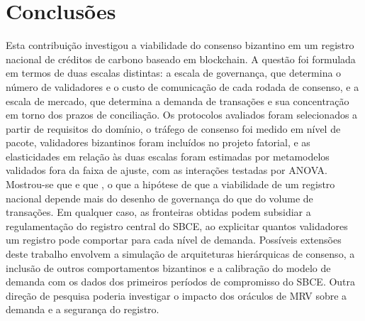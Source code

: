 \section{Conclusões}
\label{sec:conclusion}

Esta contribuição investigou a viabilidade do consenso bizantino em um registro nacional de créditos de carbono baseado em blockchain. A questão foi formulada em termos de duas escalas distintas: a escala de governança, que determina o número de validadores e o custo de comunicação de cada rodada de consenso, e a escala de mercado, que determina a demanda de transações e sua concentração em torno dos prazos de conciliação. Os protocolos avaliados foram selecionados a partir de requisitos do domínio, o tráfego de consenso foi medido em nível de pacote, validadores bizantinos foram incluídos no projeto fatorial, e as elasticidades em relação às duas escalas foram estimadas por metamodelos validados fora da faixa de ajuste, com as interações testadas por ANOVA. Mostrou-se que  e que , o que  a hipótese de que a viabilidade de um registro nacional depende mais do desenho de governança do que do volume de transações. Em qualquer caso, as fronteiras obtidas podem subsidiar a regulamentação do registro central do SBCE, ao explicitar quantos validadores um registro pode comportar para cada nível de demanda. Possíveis extensões deste trabalho envolvem a simulação de arquiteturas hierárquicas de consenso, a inclusão de outros comportamentos bizantinos e a calibração do modelo de demanda com os dados dos primeiros períodos de compromisso do SBCE. Outra direção de pesquisa poderia investigar o impacto dos oráculos de MRV sobre a demanda e a segurança do registro.
